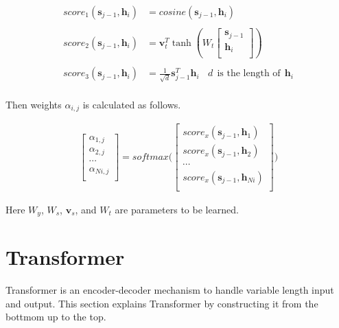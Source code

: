 \documentclass[a4]{article}
\begin{document}
\begin{equation}
\begin{aligned}
score_1\left( \bm{s}_{j-1}, \bm{h}_i\right) &= cosine\left(\bm{s}_{j-1}, \bm{h}_i \right)\\
\\
score_2\left( \bm{s}_{j-1}, \bm{h}_i\right) &= \bm{v}_t^T \tanh\left(W_t 
\begin{bmatrix}
\bm{s}_{j-1}\\
\bm{h}_{i}\\
\end{bmatrix}
\right)\\
\\
score_3\left( \bm{s}_{j-1}, \bm{h}_i\right) &= \frac{1}{\sqrt{d}}\bm{s}_{j-1}^T\bm{h}_i
\:\:\:\:d\:\:\text{is the length of}\:\:\bm{h}_i\\
\end{aligned}
\end{equation}

Then weights $\alpha_{i,j}$ is calculated as follows.

\begin{equation}
\begin{aligned}
\begin{bmatrix}
\alpha_{1,j}\\
\alpha_{2,j}\\
\cdots\\
\alpha_{Ni,j}\\
\end{bmatrix}
= softmax\Big(
\begin{bmatrix}
score_x\left( \bm{s}_{j-1}, \bm{h}_1\right)\\
score_x\left( \bm{s}_{j-1}, \bm{h}_2\right)\\
\cdots\\
score_x\left( \bm{s}_{j-1}, \bm{h}_{Ni}\right)\\
\end{bmatrix}\Big)
\end{aligned}
\end{equation}

Here $W_y$, $W_s$, $\bm{v}_s$, and $W_t$ are parameters to be learned.

\section{Transformer}
Transformer is an encoder-decoder mechanism to handle variable length input and output.
This section explains Transformer by constructing it from the bottmom up to the top.
\end{document}
